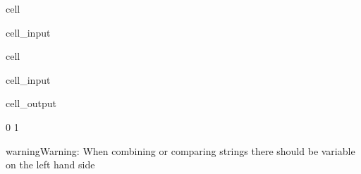 \documentclass[a4paper,10pt,english]{jupyterBook}
\begin{document}
\begin{sphinxuseclass}{cell}\begin{sphinxVerbatimInput}

\begin{sphinxuseclass}{cell_input}
\begin{sphinxVerbatim}[commandchars=\\\{\}]
\end{sphinxVerbatim}

\end{sphinxuseclass}\end{sphinxVerbatimInput}

\end{sphinxuseclass}
\begin{sphinxuseclass}{cell}\begin{sphinxVerbatimInput}

\begin{sphinxuseclass}{cell_input}
\begin{sphinxVerbatim}[commandchars=\\\{\}]
\end{sphinxVerbatim}

\end{sphinxuseclass}\end{sphinxVerbatimInput}
\begin{sphinxVerbatimOutput}

\begin{sphinxuseclass}{cell_output}
\begin{sphinxVerbatim}[commandchars=\\\{\}]
0
1
\end{sphinxVerbatim}

\end{sphinxuseclass}\end{sphinxVerbatimOutput}

\end{sphinxuseclass}
\begin{sphinxadmonition}{warning}{Warning:}
\sphinxAtStartPar
When combining or comparing strings there should  be variable on the left hand side
\end{sphinxadmonition}
\end{document}

